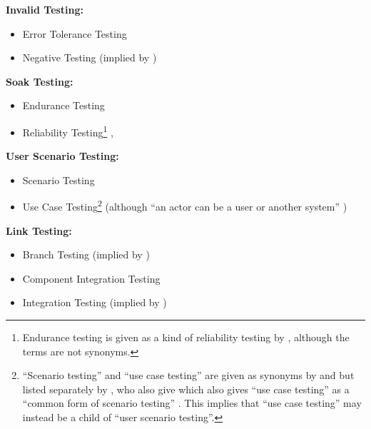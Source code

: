 \item \textbf{Invalid Testing:}
\begin{itemize}
	\item Error Tolerance Testing \cite[p.~45]{Kam2008}
	\item Negative Testing \cite{ISTQB} (implied by \cite[p.~10]{IEEE2021})
\end{itemize}
\item \textbf{Soak Testing:}
\begin{itemize}
	\item Endurance Testing \cite[p.~39]{IEEE2021}
	\item Reliability Testing\footnote{Endurance testing is given as a kind of
		      reliability testing by \cite[p.~55]{Firesmith2015}, although the
		      terms are not synonyms.} \cite[Tab.~1,~p.~26]{Gerrard2000b},
	      \cite[Tab.~2]{Gerrard2000a}
\end{itemize}
\item \textbf{User Scenario Testing:}
\begin{itemize}
	\item Scenario Testing \cite{ISTQB}
	\item Use Case Testing\footnote{``Scenario testing'' and ``use case testing''
		      are given as synonyms by \cite{ISTQB} and \cite[pp.~47-49]{Kam2008}
		      but listed separately by \cite[p.~22]{IEEE2022}, \ifnotpaper who
			      also give \else which also gives \fi ``use case testing'' as a
		      ``common form of scenario testing'' \cite[p.~20]{IEEE2021}.
		      This implies that ``use case testing'' may instead be a child of
		      ``user scenario testing''.}
	      \cite[p.~48]{Kam2008} (although ``an actor can be a user or another
	      system'' \cite[p.~20]{IEEE2021})
\end{itemize}
\item \textbf{Link Testing:}
\begin{itemize}
	\item Branch Testing (implied by \cite[p.~24]{IEEE2021})
	\item Component Integration Testing \cite[p.~45]{Kam2008}
	\item Integration Testing (implied by \cite[p.~13]{Gerrard2000a})
\end{itemize}